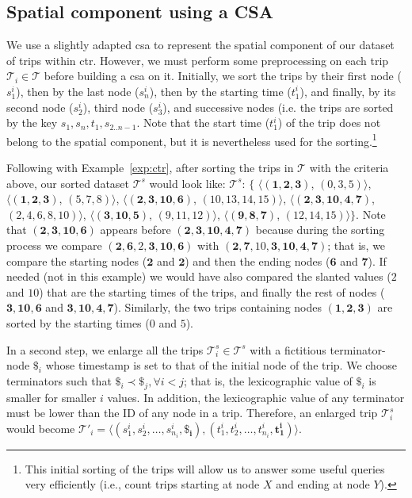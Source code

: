 	\subsection{Spatial component using a CSA}
	\label{sec:ctr:str:spat}
	We use a slightly adapted \gls{csa} to represent the spatial component of our dataset of trips within \gls{ctr}. 
	However, we must perform some preprocessing on each trip  $\mathcal{T}_i \in \mathcal{T}$ before building a \gls{csa} on it. Initially, we sort the trips by their first node ($s^i_1$), then by the last node ($s^i_n$), then by the starting time ($t^i_1$), and finally, by its second node ($s^i_2$), third node ($s^i_3$), and successive nodes (i.e. the trips are sorted by the key $s_1,s_n,t_1,s_{2..n-1}$.  Note that the start time ($t^i_1$) of the trip does not belong to the spatial component, but it is nevertheless used for the sorting.\footnote{This initial sorting of the trips will allow us to answer some useful queries very efficiently  (i.e., count trips starting at node $X$ and ending at node $Y$).}

	Following with Example~\ref{exp:ctr}, after sorting the trips in $\mathcal{T}$ with the criteria above, 
	our sorted dataset $\mathcal{T}^s$ would look like: 
	$\mathcal{T}^s$: $\{$%
	$\langle (\mathbf{1,2,3     })$, $(\mathit{0,3,5})                     \rangle$, 
	$\langle (\mathbf{1,2,3     })$, $(\mathit{5,7,8})                     \rangle$, 
	$\langle (\mathbf{2,3,10,6  })$, $(\mathit{10,13,14,15})           \rangle$, 
	$\langle (\mathbf{2,3,10,4,7})$, $(\mathit{2,4,6,8,10}) \rangle$, 
	$\langle (\mathbf{3,10,5    })$, $(\mathit{9,11,12})                     \rangle$, 
	$\langle (\mathbf{9,8,7     })$, $(\mathit{12,14,15})                    \rangle$$\}$. 
	Note that  $ (\mathbf{2,3,10,6  })$ appears before $(\mathbf{2,3,10,4,7})$ because
	during the sorting process we compare $ (\mathbf{2,6,\mathit{2},3, 10,6  })$ with $ (\mathbf{2,7,\mathit{10},3, 10,4,7})$;
	that is, we compare the starting nodes ($\mathbf{2}$ and $\mathbf{2}$) and then the ending nodes ($\mathbf{6}$ and $\mathbf{7}$).
	If needed  (not in this example) we would have also compared the slanted values ($\mathit{2}$ and $\mathit{10}$) 
	that are the starting times of the trips, and finally the rest of nodes  ($ \mathbf{3, 10,6  }$ and $ \mathbf{3, 10,4,7}$).
	Similarly, the two trips containing nodes $ (\mathbf{1,2,3})$ are sorted by the starting times ($\mathit{0}$ and $\mathit{5}$).


	In a second step, we enlarge all the trips $\mathcal{T}^s_i \in \mathcal{T}^s$ with a fictitious \mbox{terminator-node} $\$_i$ whose
	timestamp is set to that of the initial node of the trip. We choose terminators such that $\$_i \prec \$_j, \forall i<j$; 
	that is, the lexicographic value of $\$_i$ is smaller for smaller $i$ values. In addition, the lexicographic value
	of any terminator must be lower than the ID of any node in a trip. Therefore, an enlarged trip $\mathcal{T}^s_i$
	would become $\mathcal{T}'_i =  \langle (s^i_1, s^i_2, \dots,  s^i_{n_i}, 
	\mathbf{\$_i}),(t^i_1, t^i_2, \dots,  t^i_{n_i}, \mathbf{t^i_1}) \rangle$. 

